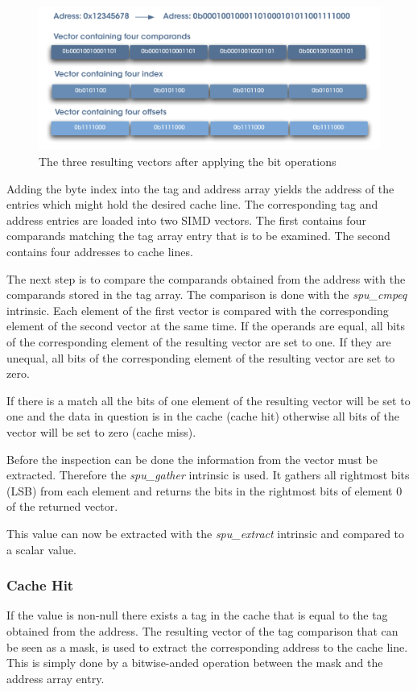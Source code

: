 \documentclass[DIV10, abstracton, openright, footsepline, headsepline, twoside, 9pt,
bigheadings]{scrreprt}
\begin{document}
\begin{figure}[H]
\centering
\includegraphics[width=\textwidth]{diagramme/addr_splat}
\caption{The three resulting vectors after applying the bit operations}
\label{fig:addr_splat}
\end{figure}


Adding the byte index into the tag and address array  yields the address of
the entries which might hold the desired cache line. The corresponding tag and
address entries are loaded into two SIMD vectors. The first contains four
comparands matching the tag array entry that is to be examined. The
second contains four addresses to cache lines.

The next step is to compare the comparands obtained from the address with the
comparands stored in the tag array. The comparison is done with the
\textit{spu\_cmpeq} intrinsic. Each element of the first vector is compared with
 the corresponding element of the second vector at the same time. If the operands
are equal, all bits of the corresponding element of the resulting vector are set
to one. If they are unequal, all bits of the corresponding element of the resulting
vector are set to zero.


If there is a match all the bits of one element of the resulting vector will be
set to one and the data in question is in the cache (cache hit) otherwise all
bits of the vector will be set to zero (cache miss).

Before the inspection can be done the information from the vector must be extracted.
Therefore the \textit{spu\_gather} intrinsic is used. It gathers all rightmost bits
(LSB) from each element and returns the bits in the rightmost bits of element 0 of the
returned vector.

This value can now be extracted with the \textit{spu\_extract} intrinsic and compared
to a scalar value.

\subsubsection{Cache Hit}
\label{sec:cacheh}
If the value is non-null there exists a tag in the cache that is equal to the tag
obtained from the address. The resulting vector of the tag comparison that can be seen
as a mask, is used to extract the corresponding address to the cache line. This is
simply done by a bitwise-anded operation between the mask and the address array entry.
\end{document}
